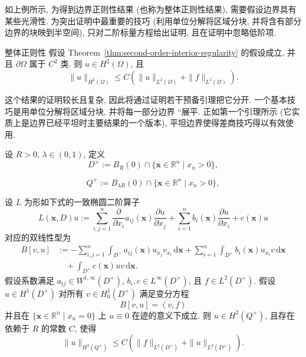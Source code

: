 如上例所示, 为得到边界正则性结果 (也称为整体正则性结果), 需要假设边界具有某些光滑性. 为突出证明中最重要的技巧 (利用单位分解将区域分块, 并将含有部分边界的块映到半空间), 只对二阶标量方程给出证明, 且在证明中忽略低阶项.

\begin{Theorem}{整体正则性}
\label{thm:global-boundary-regularity}
假设 Theorem~\ref{thm:second-order-interior-regularity} 的假设成立, 并且 $\partial\Omega$ 属于 $C^2$ 类. 则 $u\in H^2(\Omega)$, 且
\begin{equation}\label{eq:global-boundary-regularity-h2-estimate}
\|u\|_{H^2(\Omega)}\leq C(\|u\|_{L^2(\Omega)}+\|f\|_{L^2(\Omega)}).
\end{equation}

\end{Theorem}

这个结果的证明较长且复杂, 因此将通过证明若干预备引理把它分开. 一个基本技巧是用单位分解将区域分块, 并将每一部分边界 ``展平\textquotesingle\textquotesingle. 正如第一个引理所示 (它实质上是边界已经平坦时主要结果的一个版本), 平坦边界使得差商技巧得以有效使用.

\begin{Lemma}
\label{lem:flat-boundary-local-regularity}
设 $R>0$, $\lambda\in(0,1)$, 定义
\begin{equation}\label{eq:flat-boundary-outer-half-ball}
D^+:=B_R(0)\cap\{\bm{x}\in\mathbb{R}^n\mid x_n>0\},
\end{equation}

\begin{equation}\label{eq:flat-boundary-inner-half-ball}
Q^+:=B_{\lambda R}(0)\cap\{\bm{x}\in\mathbb{R}^n\mid x_n>0\},
\end{equation}

\begin{equation}\label{eq:flat-boundary-source-isolated-empty-number}\end{equation}
设 $L$ 为形如下式的一致椭圆二阶算子\[L(\bm{x},D)u:=\sum_{i,j=1}^n\frac{\partial}{\partial x_i}a_{ij}(\bm{x})\frac{\partial u}{\partial x_j}+\sum_{i=1}^nb_i(\bm{x})\frac{\partial u}{\partial x_i}+c(\bm{x})u\]对应的双线性型为\[\begin{aligned}
B[v,u]&:=-\sum_{i,j=1}^n\int_{D^+}a_{ij}(\bm{x})u_{x_j}v_{x_i}\,\mathrm{d}\bm{x}+\sum_{i=1}^n\int_{D^+}b_i(\bm{x})u_{x_i}v\,\mathrm{d}\bm{x}\\
&\quad+\int_{D^+}c(\bm{x})uv\,\mathrm{d}\bm{x}.
\end{aligned}\]假设系数满足 $a_{ij}\in W^{1,\infty}(D^+)$, $b_i,c\in L^\infty(D^+)$, 且 $f\in L^2(D^+)$. 假设 $u\in H^1(D^+)$ 对所有 $v\in H_0^1(D^+)$ 满足变分方程
\begin{equation}\label{eq:flat-boundary-variational-equation}
B[v,u]=(v,f)
\end{equation}
并且在 $\{\bm{x}\in\mathbb{R}^n\mid x_n=0\}$ 上 $u\equiv0$ 在迹的意义下成立. 则 $u\in H^2(Q^+)$, 且存在依赖于 $R$ 的常数 $C$, 使得
\begin{equation}\label{eq:flat-boundary-local-h2-estimate}
\|u\|_{H^2(Q^+)}\leq C(\|f\|_{L^2(D^+)}+\|u\|_{L^2(D^+)}).
\end{equation}

\end{Lemma}
